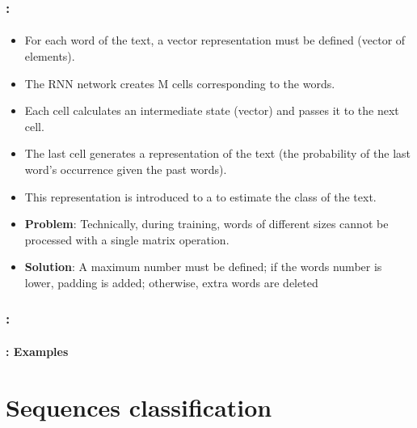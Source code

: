 \documentclass[xcolor=table]{beamer}
\begin{document}
\begin{frame}
	\frametitle{\insertshortsubtitle: \insertsection}
	\framesubtitle{\insertsubsection}
	
	\begin{itemize}
		\item For each word of the text, a vector representation must be defined (vector of  elements).
		\item The RNN network creates M cells corresponding to the  words.
		\item Each cell calculates an intermediate state (vector) and passes it to the next cell.
		\item The last cell generates a representation of the text (the probability of the last word's occurrence given the past words).
		\item This representation is introduced to a  to estimate the class of the text.
		\item \textbf{Problem}: Technically, during training, words of different sizes cannot be processed with a single matrix operation.
		\item \textbf{Solution}: \textcolor{yellow!50}{A maximum number must be defined; if the words number is lower, padding is added; otherwise, extra words are deleted}
	\end{itemize}
	
\end{frame}

\begin{frame}
	\frametitle{\insertshortsubtitle: \insertsection}
	\framesubtitle{\insertsubsection: Examples}
	
	
\end{frame}

\section{Sequences classification}
\end{document}
